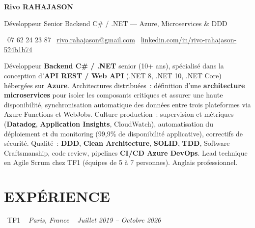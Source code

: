 \documentclass[10pt,a4paper]{article}
\begin{document}
\begin{center}
{\Huge \textbf{\color{ink}Rivo RAHAJASON}}

\vspace{4pt}

{\large \color{primary} Développeur Senior Backend C\# / .NET --- Azure, Microservices \& DDD}

\vspace{6pt}

\color{darkgray} \faPhone\  07 62 24 23 87 \quad
\color{darkgray} \faEnvelope\ \href{mailto:rivo.rahajason@gmail.com}{rivo.rahajason@gmail.com} \quad
\color{darkgray} \faLinkedin\ \href{https://linkedin.com/in/rivo-rahajason-524b1b74}{linkedin.com/in/rivo-rahajason-524b1b74}

\vspace{10pt}

\begin{minipage}{\textwidth}
\small\color{darkgray}
Développeur \textbf{Backend C\# / .NET} senior (10+ ans), spécialisé dans la conception d'\textbf{API REST / Web API} (.NET 8, .NET 10, .NET Core) hébergées sur \textbf{Azure}. Architectures distribuées~: définition d'une \textbf{architecture microservices} pour isoler les composants critiques et assurer une haute disponibilité, synchronisation automatique des données entre trois plateformes via Azure Functions et WebJobs. Culture production~: supervision et métriques (\textbf{Datadog}, \textbf{Application Insights}, CloudWatch), automatisation du déploiement et du monitoring (99,9\% de disponibilité applicative), correctifs de sécurité. Qualité~: \textbf{DDD}, \textbf{Clean Architecture}, \textbf{SOLID}, \textbf{TDD}, Software Craftsmanship, code review, pipelines \textbf{CI/CD Azure DevOps}. Lead technique en Agile Scrum chez TF1 (équipes de 5 à 7 personnes). Anglais professionnel.
\end{minipage}

\vspace{16pt}
\end{center}

\section*{EXPÉRIENCE}

\noindent\textcolor{primary}{ \faBuilding\ TF1} \quad
\textit{ \small \textcolor{darkgray}{ \faMapMarker\ } Paris, France } \hfill
\textit{ \small \textcolor{darkgray}{ \faCalendar\ } Juillet 2019 -- Octobre 2026 }
\end{document}
